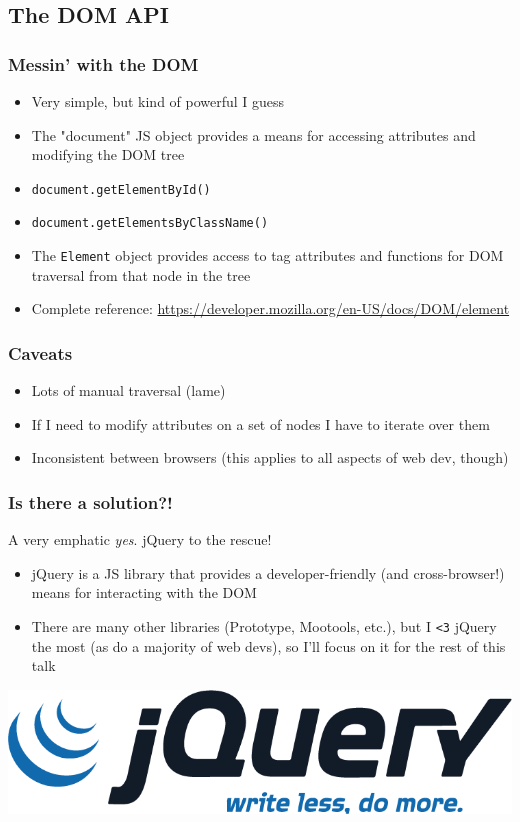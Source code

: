 \documentclass[10pt]{beamer}
\begin{document}
\subsection{The DOM API}
\frame
{
  \frametitle{Messin' with the DOM}

  \begin{itemize}
    \item Very simple, but kind of powerful I guess
    \item The "document" JS object provides a means for accessing attributes and modifying the DOM tree
    \item \lstinline|document.getElementById()|
    \item \lstinline|document.getElementsByClassName()|
    \item The \lstinline|Element| object provides access to tag attributes and functions for DOM traversal from that node in the tree
    \item Complete reference: \url{https://developer.mozilla.org/en-US/docs/DOM/element}
  \end{itemize}
}

\frame
{
  \frametitle{Caveats}

  \begin{itemize}
    \item Lots of manual traversal (lame)
    \item If I need to modify attributes on a set of nodes I have to iterate over them
    \item Inconsistent between browsers (this applies to all aspects of web dev, though)
  \end{itemize}
}

\frame
{
  \frametitle{Is there a solution?!}

  A very emphatic \emph{yes}. jQuery to the rescue!

  \begin{itemize}
    \item jQuery is a JS library that provides a developer-friendly (and cross-browser!) means for interacting with the DOM
    \item There are many other libraries (Prototype, Mootools, etc.), but I \lstinline|<3| jQuery the most (as do a majority of web devs), so I'll focus on it for the rest of this talk
  \end{itemize}

  \begin{center}
    \includegraphics[scale=0.2]{./images/jquery_logo.png}
  \end{center}
}
\end{document}
